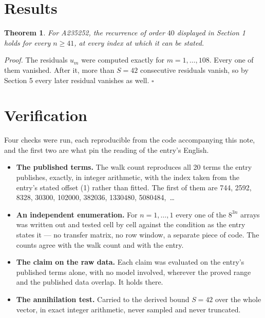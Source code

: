 \documentclass[11pt]{article}
\newtheorem{theorem}{Theorem}
\theoremstyle{definition}
\begin{document}
\section{Results}

\begin{theorem} For A235252, the recurrence of order $40$ displayed in Section 1 holds for every $n \ge 41$, at every index at which it can be stated.\end{theorem}

{\itshape Proof.} The residuals $u_m$ were computed exactly for $m = 1,\dots,108$. Every one of them vanished. After it, more than $S = 42$ consecutive residuals vanish, so by Section 5 every later residual vanishes as well. $\square$

\section{Verification}

Four checks were run, each reproducible from the code accompanying this note, and the first two are what pin the reading of the entry's English.

\begin{itemize}

\item {\bfseries The published terms.} The walk count reproduces all 20 terms the entry publishes, exactly, in integer arithmetic, with the index taken from the entry's stated offset (1) rather than fitted. The first of them are 744, 2592, 8328, 30300, 102000, 382036, 1330480, 5080484,~\dots

\item {\bfseries An independent enumeration.} For $n = 1,\dots,1$ every one of the $8^{3n}$ arrays was written out and tested cell by cell against the condition as the entry states it --- no transfer matrix, no row window, a separate piece of code. The counts agree with the walk count and with the entry.

\item {\bfseries The claim on the raw data.} Each claim was evaluated on the entry's published terms alone, with no model involved, wherever the proved range and the published data overlap. It holds there.

\item {\bfseries The annihilation test.} Carried to the derived bound $S = 42$ over the whole vector, in exact integer arithmetic, never sampled and never truncated.

\end{itemize}
\end{document}
